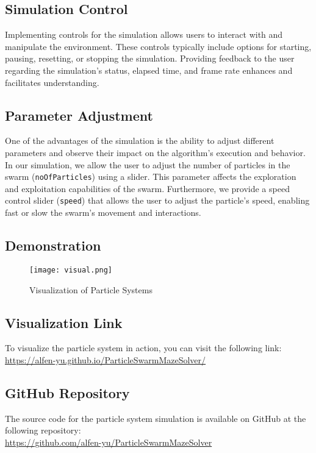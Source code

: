 \documentclass{article}
\begin{document}
\subsection{Simulation Control}
Implementing controls for the simulation allows users to interact with and manipulate the environment. These controls typically include options for starting, pausing, resetting, or stopping the simulation. Providing feedback to the user regarding the simulation's status, elapsed time, and frame rate enhances and facilitates understanding.

\subsection{Parameter Adjustment}
One of the advantages of the simulation is the ability to adjust different parameters and observe their impact on the algorithm's execution and behavior. In our simulation, we allow the user to adjust the number of particles in the swarm (\texttt{noOfParticles}) using a slider. This parameter affects the exploration and exploitation capabilities of the swarm.
Furthermore, we provide a speed control slider (\texttt{speed}) that allows the user to adjust the particle's speed, enabling fast or slow the swarm's movement and interactions.

\subsection{Demonstration}
\begin{figure}[htbp]
    \centering
    \texttt{[image: visual.png]}
    \caption{Visualization of Particle Systems}
    \label{fig:visual}
\end{figure}

\subsection{Visualization Link}
To visualize the particle system in action, you can visit the following link: \\
\url{https://alfen-yu.github.io/ParticleSwarmMazeSolver/}

\subsection{GitHub Repository}
The source code for the particle system simulation is available on GitHub at the following repository: \\
\url{https://github.com/alfen-yu/ParticleSwarmMazeSolver}
\end{document}
